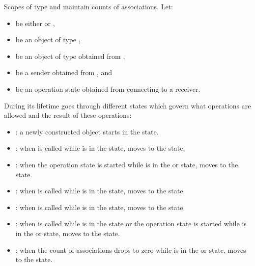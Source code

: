 \pnum
Scopes of type  and 
maintain counts of associations.
Let:
\begin{itemize}
\item
{} be either  or ,
\item
{} be an object of type ,
\item
{} be an object of type 
obtained from ,
\item
{} be a sender obtained from , and
\item
{} be an operation state obtained from
connecting  to a receiver.
\end{itemize}
During its lifetime  goes through different states
which govern what operations are allowed and the result of these operations:

\begin{itemize}
\item
{}:
a newly constructed object starts in the  state.

\item
{}:
when  is called
while  is in the  state,
 moves to the  state.

\item
{}:
when the operation state  is started
while  is in the  or  state,
 moves to the  state.

\item
{}:
when  is called
while  is in the  state,
 moves to the  state.

\item
{}:
when  is called
while  is in the  state,
 moves to the  state.

\item
{}:
when  is called
while  is in the  state or
the operation state  is started
while  is in
the  or  state,
 moves to the  state.

\item
{}:
when the count of associations drops to zero
while  is in
the  or  state,
 moves to the  state.
\end{itemize}

